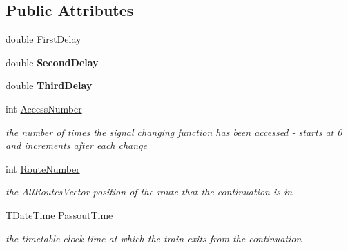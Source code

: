 \subsection*{Public Attributes}
\begin{DoxyCompactItemize}
\item 
double \mbox{\hyperlink{class_t_train_controller_1_1_t_continuation_auto_sig_entry_ab5a944eed2be17d13d99a9070f78c785}{First\+Delay}}
\item 
\mbox{\label{class_t_train_controller_1_1_t_continuation_auto_sig_entry_a637042cd9aa1c141c68ca1979935c8d8}} 
double {\bfseries Second\+Delay}
\item 
\mbox{\label{class_t_train_controller_1_1_t_continuation_auto_sig_entry_ad393d737f9031743cabfc1fbd1ac6239}} 
double {\bfseries Third\+Delay}
\item 
\mbox{\label{class_t_train_controller_1_1_t_continuation_auto_sig_entry_ae4cf92f0e912fe54c7b9549ba4158e90}} 
int \mbox{\hyperlink{class_t_train_controller_1_1_t_continuation_auto_sig_entry_ae4cf92f0e912fe54c7b9549ba4158e90}{Access\+Number}}
\begin{DoxyCompactList}\small\item\em the number of times the signal changing function has been accessed -\/ starts at 0 and increments after each change \end{DoxyCompactList}\item 
\mbox{\label{class_t_train_controller_1_1_t_continuation_auto_sig_entry_a20f64023350c7394250f784b58a5c036}} 
int \mbox{\hyperlink{class_t_train_controller_1_1_t_continuation_auto_sig_entry_a20f64023350c7394250f784b58a5c036}{Route\+Number}}
\begin{DoxyCompactList}\small\item\em the All\+Routes\+Vector position of the route that the continuation is in \end{DoxyCompactList}\item 
\mbox{\label{class_t_train_controller_1_1_t_continuation_auto_sig_entry_a658b7d6efd311690bb9c36e3518e3ff5}} 
T\+Date\+Time \mbox{\hyperlink{class_t_train_controller_1_1_t_continuation_auto_sig_entry_a658b7d6efd311690bb9c36e3518e3ff5}{Passout\+Time}}
\begin{DoxyCompactList}\small\item\em the timetable clock time at which the train exits from the continuation \end{DoxyCompactList}\end{DoxyCompactItemize}


